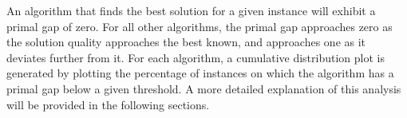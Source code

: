 An algorithm that finds the best solution for a given instance will exhibit a primal gap of zero.
For all other algorithms, the primal gap approaches zero as the solution quality approaches the best known,
and approaches one as it deviates further from it.
For each algorithm, a cumulative distribution plot is generated by plotting the percentage of instances
on which the algorithm has a primal gap below a given threshold. A more detailed explanation of this analysis will be provided in the following sections.
